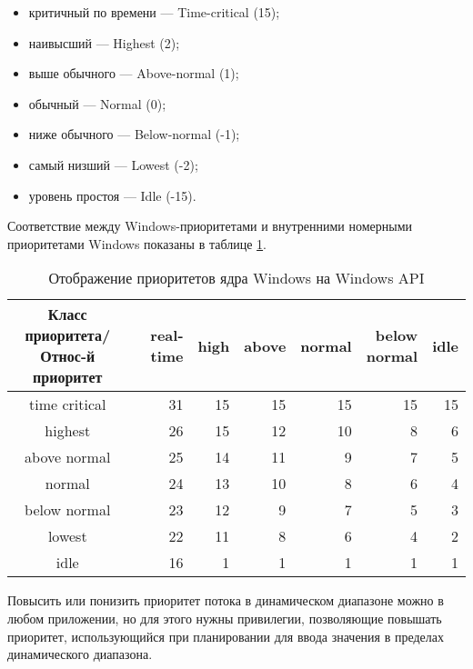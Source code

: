 \begin{itemize}[label*=--]
	\item критичный по времени --- Time-critical (15);
	\item наивысший --- Highest (2);
	\item выше обычного --- Above-normal (1);
	\item обычный --- Normal (0);
	\item ниже обычного --- Below-normal (-1);
	\item самый низший --- Lowest (-2);
	\item уровень простоя --- Idle (-15).
\end{itemize}

Соответствие между Windows-приоритетами и внутренними номерными приоритетами Windows показаны в таблице \ref{tbl:priority}.

\begin{table}[ht]
	\begin{center}
		\begin{threeparttable}
			\caption{Отображение приоритетов ядра Windows на Windows API}
			\label{tbl:priority}
			\begin{tabular}{|c|r|r|r|r|r|r|}
				\hline
				\bfseries \makecell{Класс приоритета/ \\ Относ-й приоритет} & \bfseries real-time & \bfseries high & \bfseries above &
				\bfseries normal & \bfseries \makecell{below \\ normal} & \bfseries idle \\
				\hline
				time critical & 31 & 15 & 15 & 15 & 15 & 15 \\
				\hline
				highest & 26 & 15 & 12 & 10 & 8 & 6 \\
				\hline
				above normal & 25 & 14 & 11 & 9 & 7 & 5 \\
				\hline
				normal & 24 & 13 & 10 & 8 & 6 & 4 \\
				\hline
				below normal & 23 & 12 & 9 & 7 & 5 & 3 \\
				\hline
				lowest & 22 & 11 & 8 & 6 & 4 & 2 \\
				\hline
				idle & 16 & 1 & 1 & 1 & 1 & 1 \\
				\hline
			\end{tabular}
		\end{threeparttable}
	\end{center}
\end{table}

Повысить или понизить приоритет потока в динамическом диапазоне можно
в любом приложении, но для этого нужны привилегии, позволяющие повышать
приоритет, использующийся при планировании для ввода значения в пределах
динамического диапазона.

